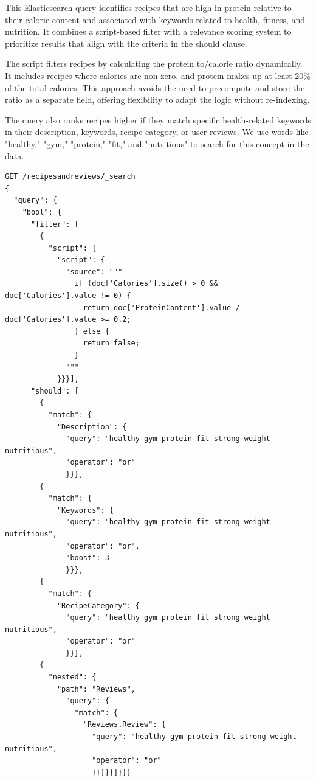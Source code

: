 \begin{enumerate}
    This Elasticsearch query identifies recipes that are high in protein relative to their calorie content and associated with keywords related to health, fitness, and nutrition. It combines a script-based filter with a relevance scoring system to prioritize results that align with the criteria in the should clause.

    The script filters recipes by calculating the protein to/calorie ratio dynamically. It includes recipes where calories are non-zero, and protein makes up at least 20\% of the total calories. This approach avoids the need to precompute and store the ratio as a separate field, offering flexibility to adapt the logic without re-indexing. 

    The query also ranks recipes higher if they match specific health-related keywords in their description, keywords, recipe category, or user reviews. We use words like "healthy," "gym," "protein," "fit," and "nutritious" to search for this concept in the data.

    \begin{verbatim}
GET /recipesandreviews/_search
{
  "query": {
    "bool": {
      "filter": [
        {
          "script": {
            "script": {
              "source": """
                if (doc['Calories'].size() > 0 && doc['Calories'].value != 0) {
                  return doc['ProteinContent'].value / doc['Calories'].value >= 0.2;
                } else {
                  return false;
                }
              """
            }}}],
      "should": [
        {
          "match": {
            "Description": {
              "query": "healthy gym protein fit strong weight nutritious",
              "operator": "or"
              }}},
        {
          "match": {
            "Keywords": {
              "query": "healthy gym protein fit strong weight nutritious",
              "operator": "or",
              "boost": 3
              }}},
        {
          "match": {
            "RecipeCategory": {
              "query": "healthy gym protein fit strong weight nutritious",
              "operator": "or"
              }}},
        {
          "nested": {
            "path": "Reviews",
              "query": {
                "match": {
                  "Reviews.Review": {
                    "query": "healthy gym protein fit strong weight nutritious",
                    "operator": "or"
                    }}}}}]}}}
    \end{verbatim}


\end{enumerate}
